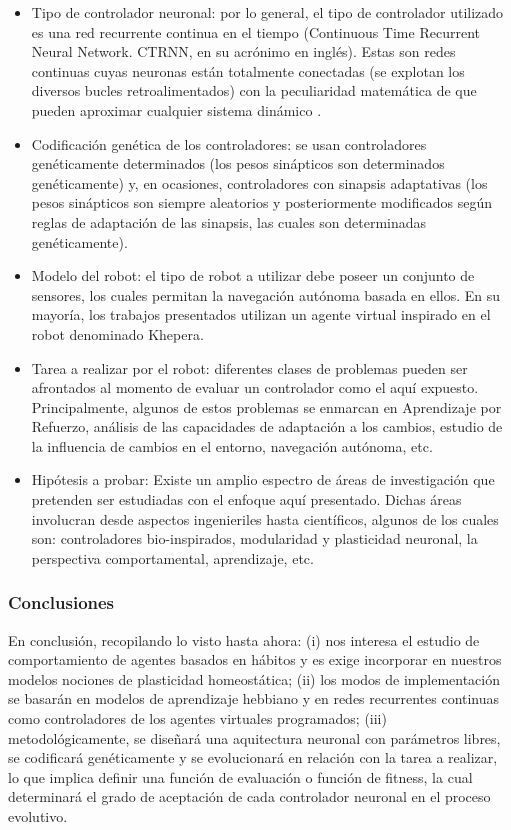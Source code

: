 \begin{itemize}
  \item{Tipo de controlador neuronal: por lo general, el tipo de controlador utilizado es una red recurrente continua en el tiempo (Continuous Time Recurrent Neural Network. CTRNN, en su acrónimo en inglés). Estas son redes continuas cuyas neuronas están totalmente conectadas (se explotan los diversos bucles retroalimentados) con la peculiaridad matemática de que pueden aproximar cualquier sistema dinámico \cite{FunaYNaka}.}
  \item{Codificación genética de los controladores: se usan controladores genéticamente determinados (los pesos sinápticos son determinados genéticamente) y, en ocasiones, controladores con sinapsis adaptativas (los pesos sinápticos son siempre aleatorios y posteriormente modificados según reglas de adaptación de las sinapsis, las cuales son determinadas genéticamente).}
  \item{Modelo del robot: el tipo de robot a utilizar debe poseer un conjunto de sensores, los cuales permitan la navegación autónoma basada en ellos. En su mayoría, los trabajos presentados utilizan un agente virtual inspirado en el robot denominado Khepera.}
  \item{Tarea a realizar por el robot: diferentes clases de problemas pueden ser afrontados al momento de evaluar un controlador como el aquí expuesto. Principalmente, algunos de estos problemas se enmarcan en Aprendizaje por Refuerzo, análisis de las capacidades de adaptación a los cambios, estudio de la influencia de cambios en el entorno, navegación autónoma, etc. }
  \item{Hipótesis a probar: Existe un amplio espectro de áreas de investigación que pretenden ser estudiadas con el enfoque aquí presentado. Dichas áreas involucran desde aspectos ingenieriles hasta científicos\cite{Nolfi}, algunos de los cuales son: controladores bio-inspirados, modularidad y plasticidad neuronal, la perspectiva comportamental, aprendizaje, etc.}
\end{itemize}

\subsubsection{Conclusiones}
En conclusión, recopilando lo visto hasta ahora: (i) nos interesa el estudio de comportamiento de agentes basados en hábitos y es exige incorporar en nuestros modelos nociones de plasticidad homeostática; (ii) los modos de implementación se basarán en modelos de aprendizaje hebbiano y en redes recurrentes continuas como controladores de los agentes virtuales programados; (iii) metodológicamente, se diseñará una aquitectura neuronal con parámetros libres, se codificará genéticamente y se evolucionará en relación con la tarea a realizar, lo que implica definir una función de evaluación o función de fitness, la cual determinará el grado de aceptación de cada controlador neuronal en el proceso evolutivo.
